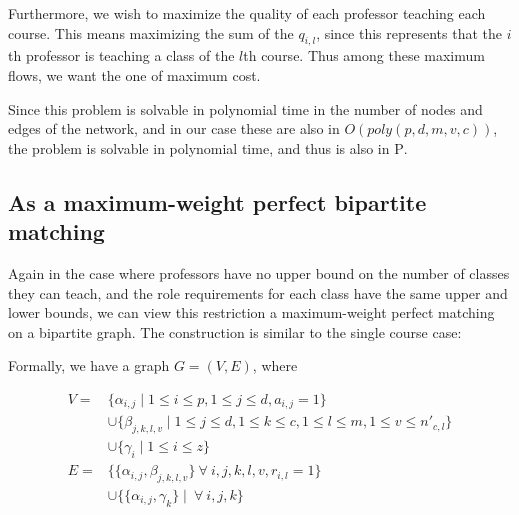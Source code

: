 Furthermore, we wish to maximize the quality of each professor teaching each course. This means maximizing the sum of the $q_{i, l}$, since this represents that the $i$th professor is teaching a class of the $l$th course. Thus among these maximum flows, we want the one of maximum cost.

Since this problem is solvable in polynomial time in the number of nodes and edges of the network, and in our case these are also in $O(poly(p, d, m, v, c))$, the problem is solvable in polynomial time, and thus is also in \textsc{P}.


\subsection{As a maximum-weight perfect bipartite matching}
Again in the case where professors have no upper bound on the number of classes they can teach, and the role requirements for each class have the same upper and lower bounds, we can view this restriction a maximum-weight perfect matching on a bipartite graph. The construction is similar to the single course case:

\begin{center}
\end{center}

Formally, we have a graph $G = (V, E)$, where

\begin{align*}
  V = & \{\alpha_{i, j} \mid 1 \le i \le p, 1 \le j \le d, a_{i, j} = 1\}\\
    & \cup \{\beta_{j, k, l, v} \mid 1 \le j \le d, 1 \le k \le c, 1 \le l \le m, 1 \le v \le n'_{c, l}\}\\
    & \cup \{\gamma_i \mid 1 \le i \le z\}\\
  E = & \{\{\alpha_{i, j}, \beta_{j, k, l, v}\}\ \forall\ i, j, k, l, v, r_{i, l} = 1\}\\
      & \cup \{\{\alpha_{i, j}, \gamma_k\} \mid \ \forall\ i, j, k\}
\end{align*}

